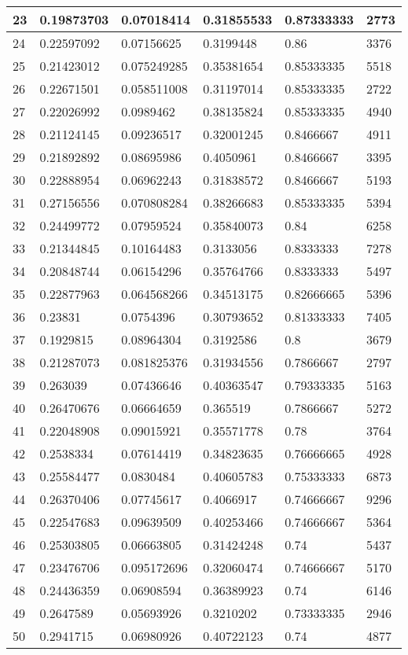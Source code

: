 \begin{longtable}{|l|l|l|l|l|l|}
23 & 0.19873703 & 0.07018414 & 0.31855533 & 0.87333333 & 2773 \\ \hline 
24 & 0.22597092 & 0.07156625 & 0.3199448 & 0.86 & 3376 \\ \hline 
25 & 0.21423012 & 0.075249285 & 0.35381654 & 0.85333335 & 5518 \\ \hline 
26 & 0.22671501 & 0.058511008 & 0.31197014 & 0.85333335 & 2722 \\ \hline 
27 & 0.22026992 & 0.0989462 & 0.38135824 & 0.85333335 & 4940 \\ \hline 
28 & 0.21124145 & 0.09236517 & 0.32001245 & 0.8466667 & 4911 \\ \hline 
29 & 0.21892892 & 0.08695986 & 0.4050961 & 0.8466667 & 3395 \\ \hline 
30 & 0.22888954 & 0.06962243 & 0.31838572 & 0.8466667 & 5193 \\ \hline 
31 & 0.27156556 & 0.070808284 & 0.38266683 & 0.85333335 & 5394 \\ \hline 
32 & 0.24499772 & 0.07959524 & 0.35840073 & 0.84 & 6258 \\ \hline 
33 & 0.21344845 & 0.10164483 & 0.3133056 & 0.8333333 & 7278 \\ \hline 
34 & 0.20848744 & 0.06154296 & 0.35764766 & 0.8333333 & 5497 \\ \hline 
35 & 0.22877963 & 0.064568266 & 0.34513175 & 0.82666665 & 5396 \\ \hline 
36 & 0.23831 & 0.0754396 & 0.30793652 & 0.81333333 & 7405 \\ \hline 
37 & 0.1929815 & 0.08964304 & 0.3192586 & 0.8 & 3679 \\ \hline 
38 & 0.21287073 & 0.081825376 & 0.31934556 & 0.7866667 & 2797 \\ \hline 
39 & 0.263039 & 0.07436646 & 0.40363547 & 0.79333335 & 5163 \\ \hline 
40 & 0.26470676 & 0.06664659 & 0.365519 & 0.7866667 & 5272 \\ \hline 
41 & 0.22048908 & 0.09015921 & 0.35571778 & 0.78 & 3764 \\ \hline 
42 & 0.2538334 & 0.07614419 & 0.34823635 & 0.76666665 & 4928 \\ \hline 
43 & 0.25584477 & 0.0830484 & 0.40605783 & 0.75333333 & 6873 \\ \hline 
44 & 0.26370406 & 0.07745617 & 0.4066917 & 0.74666667 & 9296 \\ \hline 
45 & 0.22547683 & 0.09639509 & 0.40253466 & 0.74666667 & 5364 \\ \hline 
46 & 0.25303805 & 0.06663805 & 0.31424248 & 0.74 & 5437 \\ \hline 
47 & 0.23476706 & 0.095172696 & 0.32060474 & 0.74666667 & 5170 \\ \hline 
48 & 0.24436359 & 0.06908594 & 0.36389923 & 0.74 & 6146 \\ \hline 
49 & 0.2647589 & 0.05693926 & 0.3210202 & 0.73333335 & 2946 \\ \hline 
50 & 0.2941715 & 0.06980926 & 0.40722123 & 0.74 & 4877 \\ \hline 
\end{longtable}